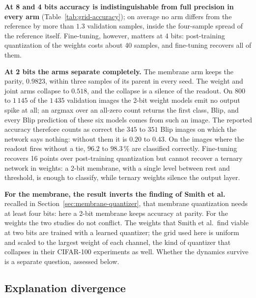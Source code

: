 \textbf{At 8 and 4 bits accuracy is indistinguishable from full precision in
every arm} (Table~\ref{tab:grid-accuracy}); on average no arm differs from the
reference by more than $1.3$ validation samples, inside the four-sample spread of
the reference itself. Fine-tuning, however, matters at 4 bits: post-training
quantization of the weights costs about 40 samples, and fine-tuning recovers all
of them.

\textbf{At 2 bits the arms separate completely.} The membrane arm keeps the parity,
$0.9823$, within three samples of its parent in every seed. The weight and
joint arms collapse to $0.518$, and the collapse is a silence of the readout. 
On $800$ to $1\,145$ of the $1\,435$ validation
images the 2-bit weight models emit no output spike at all; an argmax over an
all-zero count returns the first class, Blip, and every Blip prediction of these
six models comes from such an image. The reported accuracy therefore counts as
correct the $345$ to $351$ Blip images on which the network says nothing:
without them it is $0.20$ to $0.43$. On the images where the readout fires
without a tie, $96.2$ to $98.3\,\%$ are classified correctly. Fine-tuning recovers 16
points over post-training quantization but cannot recover a ternary network in
weights: a 2-bit membrane, with a single level between rest and threshold, is
enough to classify, while ternary weights silence the output layer.


\textbf{For the membrane, the result inverts the finding of Smith
et al.~\cite{smith2026}} recalled in Section~\ref{sec:membrane-quantizer}, that
membrane quantization needs at least four bits: here a 2-bit membrane keeps
accuracy at parity. For the weights the two studies do not conflict. The weights
that Smith et al.\ find viable at two bits are trained with a learned quantizer;
the grid used here is uniform and scaled to the largest weight of each channel,
the kind of quantizer that collapses in their CIFAR-100 experiments as well.
Whether the dynamics survive is a separate question, assessed below.

\subsection{Explanation divergence}

